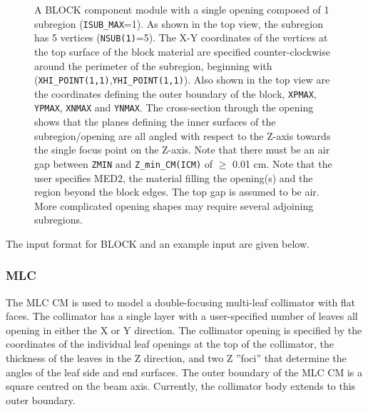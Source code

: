 \documentclass[12pt,twoside]{article}
\begin{document}
\begin{figure}[tp]
\begin{center}
\begin{htmlonly}
\end{htmlonly}
\end{center}
\vspace{1cm}
\caption[BLOCK CM geometry]
{A BLOCK component module with a single opening composed of 1
subregion ({\tt ISUB\_MAX}=1).  As shown in the top view, the subregion
has 5 vertices ({\tt NSUB(1)}=5).  The X-Y coordinates of the vertices
at the top surface of the block material are specified counter-clockwise
around the perimeter of the subregion, beginning with
({\tt XHI\_POINT(1,1)},{\tt YHI\_POINT(1,1)}).  Also shown in the top
view are the coordinates defining the outer boundary of the block,
{\tt XPMAX}, {\tt YPMAX}, {\tt XNMAX} and {\tt YNMAX}.
The cross-section through
the opening shows that the planes defining the inner surfaces of the
subregion/opening are all angled with respect to the Z-axis towards the
single focus point on the Z-axis.  Note that there must be an air gap
between {\tt ZMIN} and {\tt Z\_min\_CM(ICM)} of $\geq$ 0.01 cm.  Note that
the user specifies MED2, the material filling the opening(s) and the region
beyond the block edges.
The top gap is assumed to be air.  More complicated
opening shapes may require several adjoining subregions.}
\label{fig_BLOCKD}
\end{figure}


\clearpage
The input format for BLOCK and an example input are given below.
\begin{small}

\end{small}






\subsubsection{MLC}
\renewcommand{\rightmark}{MLC CM}
The MLC CM is used to model a double-focusing multi-leaf collimator with
flat faces.
The collimator has a single layer with a user-specified number of leaves
all opening in either the X or Y direction.  The collimator opening is
specified by the coordinates of the individual leaf openings at the top of the
collimator, the thickness of the leaves in the Z direction, and two
Z ''foci'' that determine the angles of the leaf side and end
surfaces.
The outer boundary of the MLC CM is a square centred on
the beam axis.  Currently, the collimator body extends to this outer boundary.
\end{document}
